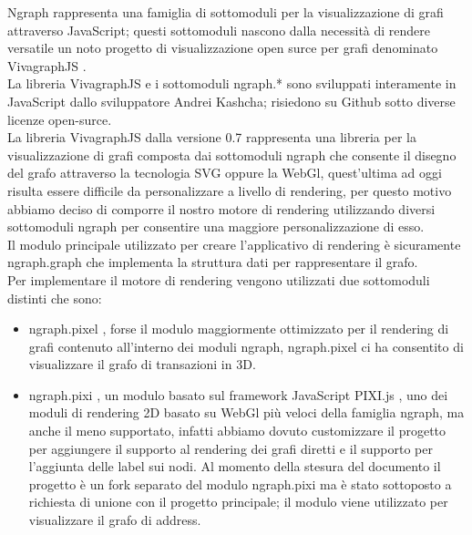 Ngraph \cite{vis:ngraph} rappresenta una famiglia di sottomoduli per la visualizzazione di grafi attraverso JavaScript; questi sottomoduli nascono dalla necessità di rendere versatile un noto progetto di visualizzazione open surce per grafi denominato VivagraphJS \cite{vis:vivagraphjs}.\\
La libreria VivagraphJS e i sottomoduli ngraph.* sono sviluppati interamente in JavaScript dallo sviluppatore Andrei Kashcha; risiedono su Github sotto diverse licenze open-surce.\\
La libreria VivagraphJS dalla versione 0.7 rappresenta una libreria per la visualizzazione di grafi composta dai sottomoduli ngraph che consente il disegno del grafo attraverso la tecnologia SVG oppure la WebGl, quest'ultima ad oggi risulta essere difficile da personalizzare a livello di rendering, per questo motivo abbiamo deciso di comporre il nostro motore di rendering utilizzando diversi sottomoduli ngraph per consentire una maggiore personalizzazione di esso.\\
Il modulo principale utilizzato per creare l'applicativo di rendering è sicuramente ngraph.graph \cite{vis:ngraph.graph} che implementa la struttura dati per rappresentare il grafo.\\
Per implementare il motore di rendering vengono utilizzati due sottomoduli distinti che sono:
\begin{itemize}
  \item ngraph.pixel \cite{vis:ngraph.pexel}, forse il modulo maggiormente ottimizzato per il rendering di grafi contenuto all'interno dei moduli ngraph, ngraph.pixel ci ha consentito di visualizzare il grafo di transazioni in 3D.
  \item ngraph.pixi \cite{vis:ngraph.pixi}, un modulo basato sul framework JavaScript PIXI.js \cite{vis:pixijs}, uno dei moduli di rendering 2D basato su WebGl più veloci della famiglia ngraph, ma anche il meno supportato, infatti abbiamo dovuto customizzare il progetto per aggiungere il supporto al rendering dei grafi diretti e il supporto per l'aggiunta delle label sui nodi. Al momento della stesura del documento il progetto è un fork separato del modulo ngraph.pixi ma è stato sottoposto a richiesta di unione con il progetto principale; il modulo viene utilizzato per visualizzare il grafo di address.
\end{itemize}

